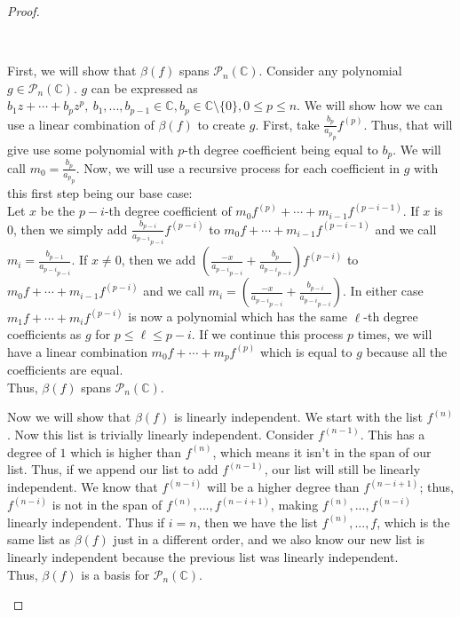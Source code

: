 \documentclass[11pt]{article}
\newcommand{\C}{\mathbb{C}}
\newenvironment{myproof}
{\begin{proof} \begin{adjustwidth}{3em}{0pt}$ $\par\nobreak\ignorespaces}
{\end{adjustwidth} \end{proof}}
\begin{document}
\begin{flushleft}
\begin{myproof}
First, we will show that $\beta (f)$ spans $\mathcal{P}_n(\C)$. Consider any polynomial $g \in \mathcal{P}_n(\C)$. $g$ can be expressed as $b_1z + \cdots + b_pz^p, \ b_1,...,b_{p-1} \in \C, b_p \in \C \setminus \{0 \}, 0 \leq p \leq n$. We will show how we can use a linear combination of $\beta (f)$ to create $g$. First, take $\frac{b_p}{{{a_p}_p}}f^{(p)}$. Thus, that will give use some polynomial with $p$-th degree coefficient being equal to $b_p$. We will call $m_0 = \frac{b_p}{{{a_p}_p}}$. Now, we will use a recursive process for each coefficient in $g$ with this first step being our base case: \\
\bigskip
Let $x$ be the $p-i$-th degree coefficient of $m_{0}f^{(p)} + \cdots + m_{i-1}f^{(p-i-1)}$. If $x$ is 0, then we simply add $\frac{b_{p-i}}{{{a_{p-i}}_{p-i}}}f^{(p-i)}$ to $m_0f + \cdots + m_{i-1}f^{(p-i-1)}$ and we call $m_{i} = \frac{b_{p-1}}{{{a_{p-i}}_{p-i}}}$. If $x \neq 0$, then we add $(\frac{-x}{{{a_{p-i}}_{p-i}}} + \frac{b_{p}}{{{a_{p-i}}_{p-i}}})f^{(p-i)}$ to $m_0f + \cdots + m_{i-1}f^{(p-i)}$ and we call $m_{i} = (\frac{-x}{{{a_{p-i}}_{p-i}}} + \frac{b_{p-i}}{{{a_{p-i}}_{p-i}}})$. In either case $m_1f + \cdots + m_{i}f^{(p-i)}$ is now a polynomial which has the same $\ell$-th degree coefficients as $g$ for $p \leq \ell \leq p-i$. If we continue this process $p$ times, we will have a linear combination $m_0f + \cdots + m_pf^{(p)}$ which is equal to $g$ because all the coefficients are equal.\\
\bigskip
Thus, $\beta (f)$ spans $\mathcal{P}_n(\C)$. \\
\bigskip

Now we will show that $\beta (f)$ is linearly independent. We start with the list $f^{(n)}$. Now this list is trivially linearly independent. Consider $f^{(n-1)}$. This has a degree of $1$ which is higher than $f^{(n)}$, which means it isn't in the span of our list. Thus, if we append our list to add $f^{(n-1)}$, our list will still be linearly independent. We know that $f^{(n-i)}$ will be a higher degree than $f^{(n-i+1)}$; thus, $f^{(n-i)}$ is not in the span of $f^{(n)},...,f^{(n-i+1)}$, making $f^{(n)},...,f^{(n-i)}$ linearly independent. Thus if $i = n$, then we have the list $f^{(n)},...,f$, which is the same list as $\beta (f)$ just in a different order, and we also know our new list is linearly independent because the previous list was linearly independent. \\

\bigskip
Thus, $\beta (f)$ is a basis for $\mathcal{P}_n(\C)$.


\end{myproof}
\end{flushleft}
\end{document}

